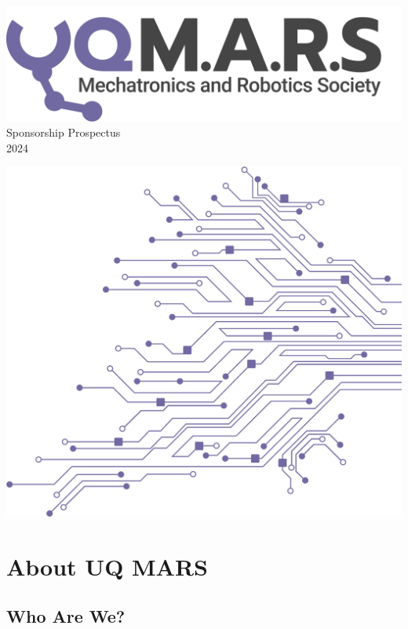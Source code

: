 \documentclass[a4paper,12pt]{report}
\begin{document}
\begin{titlepage}
    \begin{center}
        \vspace*{15mm}
        \includegraphics[width=0.7\paperwidth]{../assets/Logo (Dark).png} \\
        \vspace{1cm}
        \Huge Sponsorship Prospectus \\
        \huge \textcolor{turbo_purple}{2024}
    \end{center}
    \vfill
    \includegraphics[height=0.5\paperheight, right]{../assets/Pattern - PCB (Solid).png}
    \vspace*{10mm}
\end{titlepage}
\restoregeometry

\section*{About UQ MARS}
\subsection*{Who Are We?}
\end{document}
